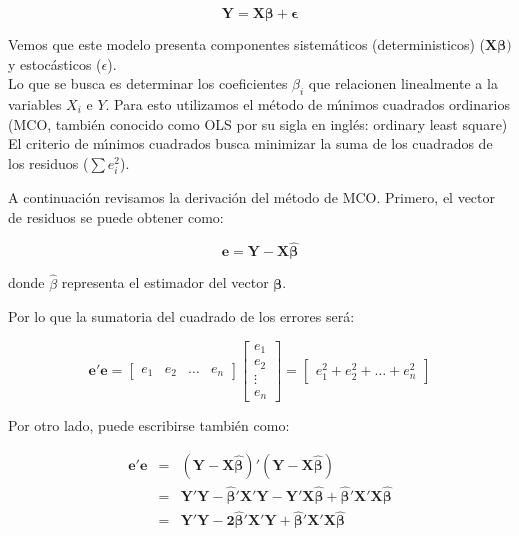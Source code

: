 \[
\mathbf{Y}=\mathbf{X}\mathbf{\beta}+\mathbf{\epsilon}
\]

Vemos que este modelo presenta componentes sistem\'aticos (deterministicos) ($\mathbf{X\beta})$ 
y estoc\'asticos ($\epsilon$).\\
Lo que se busca es determinar los coeficientes $\beta_{i}$ que relacionen linealmente a la variables $X_{i}$ e $Y$. 
Para esto utilizamos el m\'etodo de m\'\i{}nimos cuadrados ordinarios (MCO, tambi\'en conocido como OLS por su sigla en ingl\'es: ordinary least square)
El criterio de m\'\i{}nimos cuadrados busca minimizar la suma de los cuadrados
de los residuos ($\sum e_{i}^{2}$).



A continuaci\'on revisamos la derivaci\'on del m\'etodo de MCO. Primero, el vector de residuos se puede obtener como:

\[
\mathbf{e}=\mathbf{Y}-\mathbf{X\hat{\beta}}
\]

donde \textbf{$\hat{\beta}$} representa el estimador del vector $\mathbf{\beta}$.

Por lo que la sumatoria del cuadrado de los errores ser\'a:

\[
\mathbf{e'e}=\begin{bmatrix}e_{1} & e_{2} & \ldots & e_{n}\end{bmatrix}\begin{bmatrix}e_{1}\\
e_{2}\\
\vdots\\
e_{n}
\end{bmatrix}=\begin{bmatrix}e_{1}^{2}+e_{2}^{2}+\ldots+e_{n}^{2}\end{bmatrix}
\]


Por otro lado, puede escribirse tambi\'en como:

\begin{eqnarray*}
	\mathbf{e'e} & = & \left(\mathbf{Y-X\hat{\beta}}\right)'\left(\mathbf{Y-X\hat{\beta}}\right)\\
	& = & \mathbf{Y'Y}-\mathbf{\hat{\beta}'X'Y}-\mathbf{Y'X\hat{\beta}}+\mathbf{\hat{\beta}'X'X\hat{\beta}}\\
	& = & \mathbf{Y'Y}-\mathbf{2\hat{\beta}'X'Y}+\mathbf{\hat{\beta}'X'X\hat{\beta}}
\end{eqnarray*}

